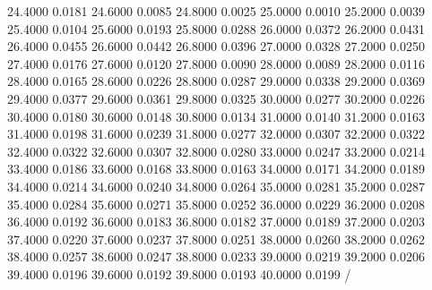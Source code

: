    24.4000    0.0181
   24.6000    0.0085
   24.8000    0.0025
   25.0000    0.0010
   25.2000    0.0039
   25.4000    0.0104
   25.6000    0.0193
   25.8000    0.0288
   26.0000    0.0372
   26.2000    0.0431
   26.4000    0.0455
   26.6000    0.0442
   26.8000    0.0396
   27.0000    0.0328
   27.2000    0.0250
   27.4000    0.0176
   27.6000    0.0120
   27.8000    0.0090
   28.0000    0.0089
   28.2000    0.0116
   28.4000    0.0165
   28.6000    0.0226
   28.8000    0.0287
   29.0000    0.0338
   29.2000    0.0369
   29.4000    0.0377
   29.6000    0.0361
   29.8000    0.0325
   30.0000    0.0277
   30.2000    0.0226
   30.4000    0.0180
   30.6000    0.0148
   30.8000    0.0134
   31.0000    0.0140
   31.2000    0.0163
   31.4000    0.0198
   31.6000    0.0239
   31.8000    0.0277
   32.0000    0.0307
   32.2000    0.0322
   32.4000    0.0322
   32.6000    0.0307
   32.8000    0.0280
   33.0000    0.0247
   33.2000    0.0214
   33.4000    0.0186
   33.6000    0.0168
   33.8000    0.0163
   34.0000    0.0171
   34.2000    0.0189
   34.4000    0.0214
   34.6000    0.0240
   34.8000    0.0264
   35.0000    0.0281
   35.2000    0.0287
   35.4000    0.0284
   35.6000    0.0271
   35.8000    0.0252
   36.0000    0.0229
   36.2000    0.0208
   36.4000    0.0192
   36.6000    0.0183
   36.8000    0.0182
   37.0000    0.0189
   37.2000    0.0203
   37.4000    0.0220
   37.6000    0.0237
   37.8000    0.0251
   38.0000    0.0260
   38.2000    0.0262
   38.4000    0.0257
   38.6000    0.0247
   38.8000    0.0233
   39.0000    0.0219
   39.2000    0.0206
   39.4000    0.0196
   39.6000    0.0192
   39.8000    0.0193
   40.0000    0.0199
/\relax
